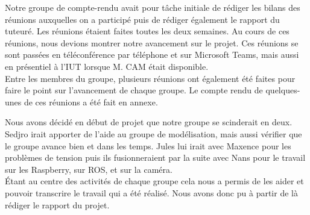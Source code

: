 Notre groupe de compte-rendu avait pour tâche initiale de rédiger les bilans des réunions auxquelles on a participé puis de rédiger également le rapport du tuteuré. Les réunions étaient faites toutes les deux semaines. Au cours de ces réunions, nous devions montrer notre avancement sur le projet. Ces réunions se sont passées en téléconférence par téléphone et sur Microsoft Teams, mais aussi en présentiel à l’IUT lorsque M. CAM était disponible.\\

Entre les membres du groupe, plusieurs réunions ont également été faites pour faire le point sur l'avancement de chaque groupe. Le compte rendu de quelques-unes de ces réunions a été fait en annexe.

Nous avons décidé en début de projet que notre groupe se scinderait en deux. Sedjro irait apporter de l’aide au groupe de modélisation, mais aussi vérifier que le groupe avance bien et dans les temps. Jules lui irait avec Maxence pour les problèmes de tension puis ils fusionneraient par la suite avec Nans pour le travail sur les Raspberry,  sur ROS, et sur la caméra.\\

Étant au centre des activités de chaque groupe cela nous a permis de les aider et pouvoir transcrire le travail qui a été réalisé. Nous avons donc pu à partir de là rédiger le rapport du projet.

